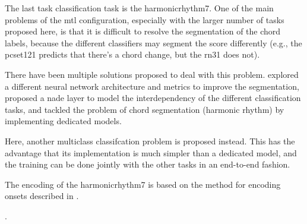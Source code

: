 
The last task classification task is the
\gls{harmonicrhythm7}. One of the main problems of the
\gls{mtl} configuration, especially with the larger number
of tasks proposed here, is that it is difficult to resolve
the segmentation of the chord labels, because the different
classifiers may segment the score differently (e.g., the
\gls{pcset121} predicts that there's a chord change, but the
\gls{rn31} does not).

There have been multiple solutions proposed to deal with
this problem. \textcite{chen2021attend} explored a different
neural network architecture and metrics to improve the
segmentation, \textcite{micchi2021deep} proposed a
\gls{nade} layer to model the interdependency of the
different classification tasks, \textcite{mcleod2021modular}
and  \textcite{wu2021melody} tackled the problem of chord
segmentation (harmonic rhythm) by implementing dedicated
models. 

Here, another multiclass classifcation problem is proposed
instead. This has the advantage that its implementation is
much simpler than a dedicated model, and the training can be
done jointly with the other tasks in an end-to-end fashion.

The encoding of the \gls{harmonicrhythm7} is based on the
method for encoding onsets described in
.



.
